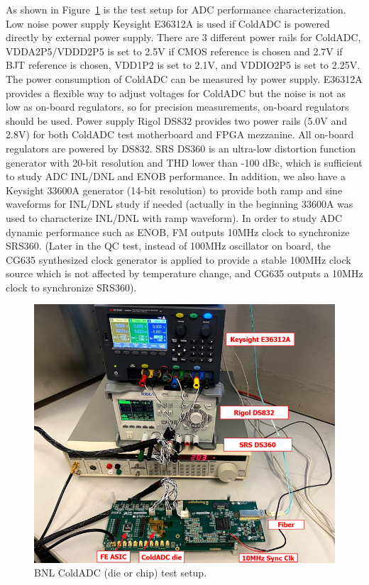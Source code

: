 As shown in Figure~\ref{fig:bnl_testsetup} is the test setup for ADC performance characterization. Low noise power supply Keysight E36312A is used if ColdADC is powered directly by external power supply. There are 3 different power rails for ColdADC, VDDA2P5/VDDD2P5 is set to 2.5V if CMOS reference is chosen and 2.7V if BJT reference is chosen, VDD1P2 is set to 2.1V, and VDDIO2P5 is set to 2.25V. The power consumption of ColdADC can be measured by power supply. E36312A provides a flexible way to adjust voltages for ColdADC but the noise is not as low as on-board regulators, so for precision measurements, on-board regulators should be used. Power supply Rigol DS832 provides two power rails (5.0V and 2.8V) for both ColdADC test motherboard and FPGA mezzanine. All on-board regulators are powered by DS832. SRS DS360 is an ultra-low distortion function generator with 20-bit resolution and THD lower than -100 dBc, which is sufficient to study ADC INL/DNL and ENOB performance. In addition, we also have a Keysight 33600A generator (14-bit resolution) to provide both ramp and sine waveforms for INL/DNL study if needed (actually in the beginning 33600A was used to characterize INL/DNL with ramp waveform). In order to study ADC dynamic performance such as ENOB, FM outputs 10MHz clock to synchronize SRS360. (Later in the QC test, instead of 100MHz oscillator on board, the CG635 synthesized clock generator is applied to provide a stable 100MHz clock source which is not affected by temperature change, and CG635 outputs a 10MHz clock to synchronize SRS360). 
\begin{figure}[!ht]
\centering
 \includegraphics[width=0.7\linewidth]{figures/BNL_testsetup.png}
  \caption{BNL ColdADC (die or chip) test setup.}
  \label{fig:bnl_testsetup}
\end{figure}


